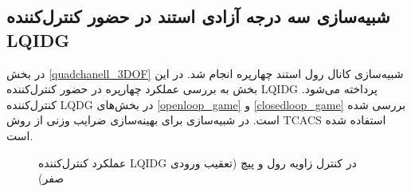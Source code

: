 \subsection{شبیه‌سازی سه درجه آزادی استند در حضور کنترل‌کننده LQIDG}\label{3DOF_lqidg_section}
در بخش
\ref{quadchanell_3DOF}
شبیه‌سازی کانال رول استند چهارپره انجام شد. در این بخش به بررسی عملکرد چهارپره در حضور کنترل‌کننده LQIDG پرداخته می‌شود. کنترل‌کننده LQDG در بخش‌های
\ref{openloop_game}
و
\ref{closedloop_game}
بررسی شده است.
 در شبیه‌سازی برای بهینه‌سازی ضرایب وزنی از روش
TCACS \cite{Karimi2010}
استفاده شده است.

\begin{figure}[H]
	\centering
	\caption{‫‪عملکرد کنترل‌کننده LQIDG در کنترل زاویه رول و پیچ (تعقیب ورودی صفر)}
\end{figure}




